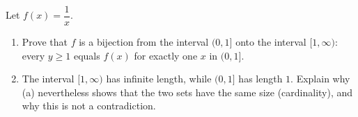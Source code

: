Let $f(x)=\dfrac1x$.
\begin{enumerate}
\item[(a)] Prove that $f$ is a bijection from the interval $(0,1]$ onto the interval $[1,\infty)$: every $y\ge1$ equals $f(x)$ for exactly one $x$ in $(0,1]$.
\item[(b)] The interval $[1,\infty)$ has infinite length, while $(0,1]$ has length $1$. Explain why (a) nevertheless shows that the two sets have the same size (cardinality), and why this is not a contradiction.
\end{enumerate}
